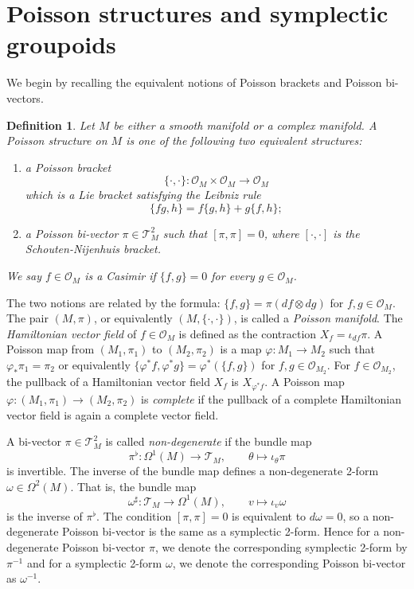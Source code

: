 \documentclass{amsart}
\newtheorem{definition}[theorem]{Definition}
\numberwithin{equation}{section}
\newcommand{\cO}{\mathcal{O}}
\newcommand{\cT}{\mathcal{T}}
\begin{document}
\section{Poisson structures and symplectic groupoids}
\label{sec:Poisson generalities}
We begin by recalling the equivalent notions of Poisson brackets and Poisson bi-vectors.
\begin{definition} 
  \label{def: PoissonMfld}
  Let $M$ be either a smooth manifold or a complex manifold.
  A \emph{Poisson structure} on $M$ is one of the following two equivalent structures:
  \begin{enumerate}
    \item a \emph{Poisson bracket}
      $$\{\cdot, \cdot\}: \cO_M \times \cO_M \to \cO_M$$
      which is a Lie bracket satisfying the Leibniz rule
      $$\{fg, h\} = f\{g,h\} + g\{f,h\};$$
    \item a \emph{Poisson bi-vector} $\pi \in \cT^2_M$ such that $[\pi, \pi] = 0$, where $[\cdot, \cdot]$ is the Schouten-Nijenhuis bracket.
  \end{enumerate}
  We say $f \in \cO_M$ is a Casimir if $\{f, g\} = 0$ for every $g\in \cO_M$.
\end{definition}

The two notions are related by the formula: $\{f, g\} = \pi (df \otimes dg)$ for $f, g\in \cO_M$.
The pair $(M, \pi)$, or equivalently $(M, \{\cdot,\cdot\})$, is called a \emph{Poisson manifold}.
The \emph{Hamiltonian vector field} of $f \in \cO_M$ is defined as the contraction $X_f = \iota_{df}\pi$.
A Poisson map from $(M_1, \pi_1)$ to $(M_2, \pi_2)$ is a map $\varphi: M_1\to M_2$ such that $\varphi_*\pi_1 = \pi_2$ or equivalently $\{\varphi^*f, \varphi^*g\} = \varphi^*(\{f, g\})$ for $f, g \in \cO_{M_2}$.
For $f \in \cO_{M_2}$, the pullback of a Hamiltonian vector field $X_f$ is $X_{\varphi^*f}$.
A Poisson map $\varphi: (M_1, \pi_1) \to (M_2, \pi_2)$ is \emph{complete} if the pullback of a complete Hamiltonian vector field is again a complete vector field.

A bi-vector $\pi \in \cT^2_M$ is called \emph{non-degenerate} if the bundle map
\[\pi^\flat: \Omega^1(M) \to \cT_M, \qquad \theta \mapsto \iota_\theta \pi\]
is invertible.
The inverse of the bundle map defines a non-degenerate 2-form $\omega \in \Omega^2(M)$.
That is, the bundle map
\[\omega^\sharp: \cT_M \to \Omega^1(M), \qquad v \mapsto \iota_v \omega\]
is the inverse of $\pi^\flat$.
The condition $[\pi,\pi]=0$ is equivalent to $d\omega = 0$, so a non-degenerate Poisson bi-vector is the same as a symplectic 2-form.
Hence for a non-degenerate Poisson bi-vector $\pi$, we denote the corresponding symplectic 2-form by $\pi^{-1}$ and for a symplectic 2-form $\omega$, we denote the corresponding Poisson bi-vector as $\omega^{-1}$.
\end{document}
